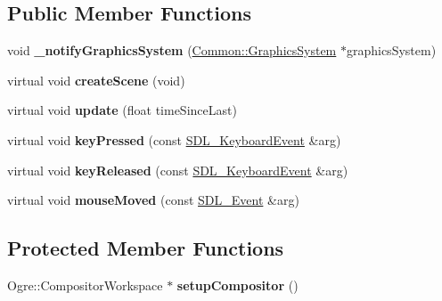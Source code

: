\subsection*{Public Member Functions}
\begin{DoxyCompactItemize}
\item 
\mbox{\label{class_graphics_game_state_a0e81886306b906569add56b43e8da91d}} 
void {\bfseries \+\_\+notify\+Graphics\+System} (\hyperlink{class_common_1_1_graphics_system}{Common\+::\+Graphics\+System} $\ast$graphics\+System)
\item 
\mbox{\label{class_graphics_game_state_af8e2cd857387dd301edc894bfb8a7ac5}} 
virtual void {\bfseries create\+Scene} (void)
\item 
\mbox{\label{class_graphics_game_state_a5a2543a4cdd551c98f4540707bc7213e}} 
virtual void {\bfseries update} (float time\+Since\+Last)
\item 
\mbox{\label{class_graphics_game_state_ae7a7e707169e5c0cdbe2f54c8b1be2f6}} 
virtual void {\bfseries key\+Pressed} (const \hyperlink{struct_s_d_l___keyboard_event}{S\+D\+L\+\_\+\+Keyboard\+Event} \&arg)
\item 
\mbox{\label{class_graphics_game_state_a9a63e8acad9cb3d9e3c389f88e303665}} 
virtual void {\bfseries key\+Released} (const \hyperlink{struct_s_d_l___keyboard_event}{S\+D\+L\+\_\+\+Keyboard\+Event} \&arg)
\item 
\mbox{\label{class_graphics_game_state_acdf08d6cfd2610be0186047adbda912e}} 
virtual void {\bfseries mouse\+Moved} (const \hyperlink{union_s_d_l___event}{S\+D\+L\+\_\+\+Event} \&arg)
\end{DoxyCompactItemize}
\subsection*{Protected Member Functions}
\begin{DoxyCompactItemize}
\item 
\mbox{\label{class_graphics_game_state_a5cb40a6795b789595dbdec2c28f420b8}} 
Ogre\+::\+Compositor\+Workspace $\ast$ {\bfseries setup\+Compositor} ()
\end{DoxyCompactItemize}
